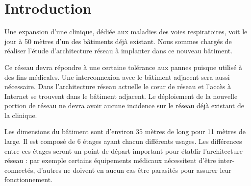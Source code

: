 \section*{Introduction} %

%
%
Une expansion d'une clinique, dédiée aux maladies des voies respiratoires, voit le jour à 50 mètres d'un des bâtiments déjà existant.
Nous sommes chargés de réaliser l'étude d'architecture réseau à implanter dans ce nouveau bâtiment.

%
%
Ce réseau devra répondre à une certaine tolérance aux pannes puisque utilisé à des fins médicales.
Une interconnexion avec le bâtiment adjacent sera aussi nécessaire.
Dans l'architecture réseau actuelle le cœur de réseau et l'accès à Internet se trouvent dans le bâtiment adjacent.
Le déploiement de la nouvelle portion de réseau ne devra avoir aucune incidence sur le réseau déjà existant de la clinique.

%
%
Les dimensions du bâtiment sont d'environ 35 mètres de long pour 11 mètres de large.
Il est composé de 6 étages ayant chacun différents usages.
Les différences entre ces étages seront un point de départ important pour établir l'architecture réseau :
par exemple certains équipements médicaux nécessitent d'être inter-connectés, d'autres ne doivent en aucun cas être parasités pour assurer leur fonctionnement.

%
%
